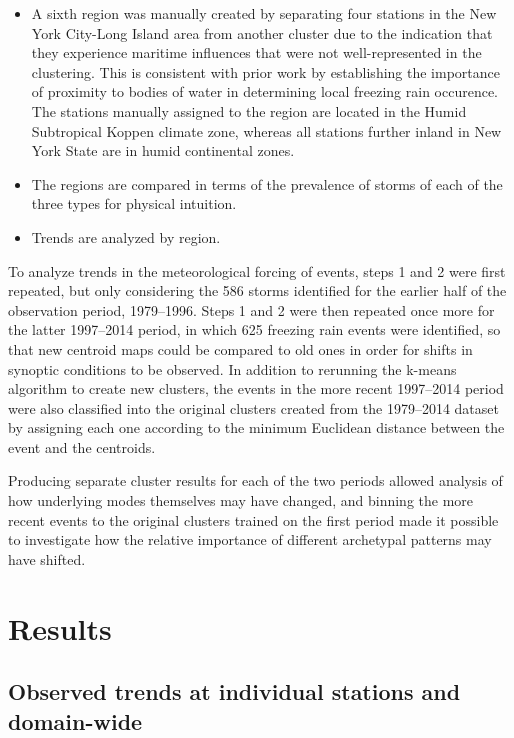 \documentclass[twocol]{ametsoc}
\begin{document}
\begin{enumerate}
\begin{itemize}
\item
A sixth region was manually created by separating four stations in the New York City-Long Island area from another cluster due to the indication that they experience maritime influences that were not well-represented in the clustering. This is consistent with prior work by \citet{bernstein2000regional} establishing the importance of proximity to bodies of water in determining local freezing rain occurence. The stations manually assigned to the region are located in the Humid Subtropical Koppen climate zone, whereas all stations further inland in New York State are in humid continental zones.
\item
The regions are compared in terms of the prevalence of storms of each of the three types for physical intuition.
\item
Trends are analyzed by region.
\end{itemize}
\end{enumerate}

To analyze trends in the meteorological forcing of events, steps 1 and 2 were first repeated, but only considering the 586 storms identified for the earlier half of the observation period, 1979--1996. Steps 1 and 2 were then repeated once more for the latter 1997--2014 period, in which 625 freezing rain events were identified, so that new centroid maps could be compared to old ones in order for shifts in synoptic conditions to be observed. In addition to rerunning the k-means algorithm to create new clusters, the events in the more recent 1997–2014 period were also classified into the original clusters created from the 1979–2014 dataset by assigning each one according to the minimum Euclidean distance between the event and the centroids. 

Producing separate cluster results for each of the two periods allowed analysis of how underlying modes themselves may have changed, and binning the more recent events to the original clusters trained on the first period made it possible to investigate how the relative importance of different archetypal patterns may have shifted.

\section{Results}

\subsection{Observed trends at individual stations and domain-wide}
\end{document}
